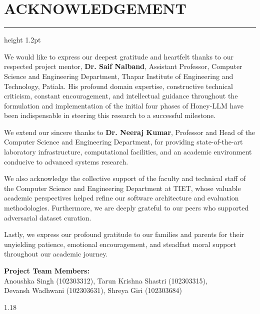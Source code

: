 \documentclass[12pt,a4paper,oneside]{report}
\begin{document}
\chapter*{ACKNOWLEDGEMENT}
\hrule height 1.2pt
\vspace{0.15in}

We would like to express our deepest gratitude and heartfelt thanks to our respected project mentor, \textbf{Dr. Saif Nalband}, Assistant Professor, Computer Science and Engineering Department, Thapar Institute of Engineering and Technology, Patiala. His profound domain expertise, constructive technical criticism, constant encouragement, and intellectual guidance throughout the formulation and implementation of the initial four phases of Honey-LLM have been indispensable in steering this research to a successful milestone.

We extend our sincere thanks to \textbf{Dr. Neeraj Kumar}, Professor and Head of the Computer Science and Engineering Department, for providing state-of-the-art laboratory infrastructure, computational facilities, and an academic environment conducive to advanced systems research.

We also acknowledge the collective support of the faculty and technical staff of the Computer Science and Engineering Department at TIET, whose valuable academic perspectives helped refine our software architecture and evaluation methodologies. Furthermore, we are deeply grateful to our peers who supported adversarial dataset curation.

Lastly, we express our profound gratitude to our families and parents for their unyielding patience, emotional encouragement, and steadfast moral support throughout our academic journey.

\vspace{0.25in}
\noindent\textbf{Project Team Members:} \\
Anoushka Singh (102303312), Tarun Krishna Shastri (102303315), \\
Devansh Wadhwani (102303631), Shreya Giri (102303684)

\newpage

\begin{spacing}{1.18}
\tableofcontents
\end{spacing}
\newpage
\end{document}
